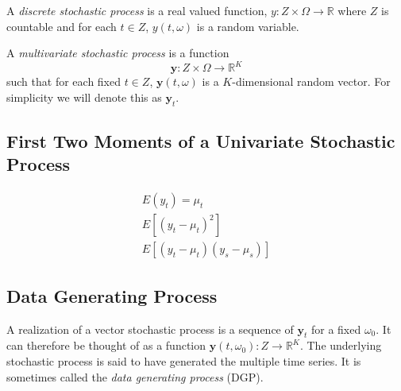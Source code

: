 \documentclass{article}
\begin{document}
            A \textit{discrete stochastic process} is a real valued function, 
            $y: Z \times \Omega \rightarrow \mathbb{R}$ where $Z$ is countable and
            for each $t \in Z$, $y(t, \omega)$ is a random variable.

            A \textit{multivariate stochastic process} is a function
            \[
                \mathbf{y}: Z \times \Omega \rightarrow \mathbb{R}^K
            \]
            such that for each fixed $t \in Z$, $\mathbf{y}(t, \omega)$ is a
            $K$-dimensional random vector. For simplicity we will denote
            this as $\mathbf{y}_t$.

        \subsection{First Two Moments of a Univariate Stochastic Process}

            \begin{align*}
                E(y_t) = \mu_t \\
                E[(y_t - \mu_t)^2] \\
                E[(y_t - \mu_t)(y_s - \mu_s)]
            \end{align*}

        \subsection{Data Generating Process}

            A realization of a vector stochastic process is a sequence
            of $\mathbf{y}_t$ for a fixed $\omega_0$. It can therefore be 
            thought of as a function $\mathbf{y}(t, \omega_0): 
            Z \rightarrow \mathbb{R}^K$. The underlying stochastic process 
            is said to have generated the multiple time series. It is
            sometimes called the \textit{data generating process} (DGP).

        
\end{document}

